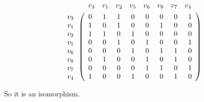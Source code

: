 \documentclass{article}
\begin{document}
\begin{enumerate}[i)]
\begin{minipage}{0.47\linewidth}
\begin{gather*}
\begin{array}{c@{\hspace{2em}}cccccccc}
&v_3&v_1&v_2&v_5&v_6&v_8&v_7&v_4
\end{array}
\\
\begin{array}{c}
v_3\\v_1\\v_2\\v_5\\v_6\\v_8\\v_7\\v_4
\end{array}\left(
\begin{array}{c@{\hspace{1.5em}}c@{\hspace{1.5em}}c@{\hspace{1.5em}}c@{\hspace{1.5em}}c@{\hspace{1.5em}}c@{\hspace{1.5em}}c@{\hspace{1.5em}}c}
0&1&1&0&0&0&0&1\\
1&0&1&0&0&1&0&0\\
1&1&0&1&0&0&0&0\\
0&0&1&0&1&0&0&1\\
0&0&0&1&0&1&1&0\\
0&1&0&0&1&0&1&0\\
0&0&0&0&1&1&0&1\\
1&0&0&1&0&0&1&0\\
\end{array}\right)
\end{gather*}
\end{minipage}


So it is an isomorphism.

\end{enumerate}
\end{document}
